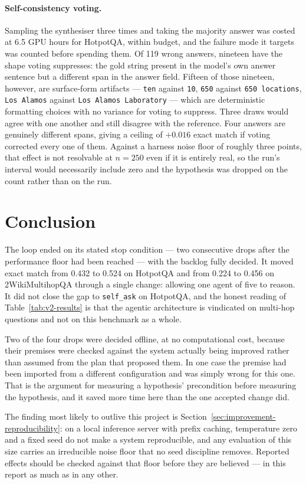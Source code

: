 \paragraph{Self-consistency voting.} Sampling the synthesiser three times and
taking the majority answer was costed at 6.5 GPU hours for HotpotQA, within
budget, and the failure mode it targets was counted before spending them. Of
119 wrong answers, nineteen have the shape voting suppresses: the gold string
present in the model's own answer sentence but a different span in the answer
field. Fifteen of those nineteen, however, are surface-form artifacts ---
\texttt{ten} against \texttt{10}, \texttt{650} against \texttt{650 locations},
\texttt{Los Alamos} against \texttt{Los Alamos Laboratory} --- which are
deterministic formatting choices with no variance for voting to suppress. Three
draws would agree with one another and still disagree with the reference. Four
answers are genuinely different spans, giving a ceiling of $+0.016$ exact match
if voting corrected every one of them. Against a harness noise floor of roughly
three points, that effect is not resolvable at $n = 250$ even if it is entirely
real, so the run's interval would necessarily include zero and the hypothesis
was dropped on the count rather than on the run.

\section{Conclusion}
\label{sec:improvement-conclusion}

The loop ended on its stated stop condition --- two consecutive drops after the
performance floor had been reached --- with the backlog fully decided. It moved
exact match from 0.432 to 0.524 on HotpotQA and from 0.224 to 0.456 on
2WikiMultihopQA through a single change: allowing one agent of five to reason.
It did not close the gap to \texttt{self\_ask} on HotpotQA, and the honest
reading of Table~\ref{tab:v2-results} is that the agentic architecture is
vindicated on multi-hop questions and not on this benchmark as a whole.

Two of the four drops were decided offline, at no computational cost, because
their premises were checked against the system actually being improved rather
than assumed from the plan that proposed them. In one case the premise had been
imported from a different configuration and was simply wrong for this one. That
is the argument for measuring a hypothesis' precondition before measuring the
hypothesis, and it saved more time here than the one accepted change did.

The finding most likely to outlive this project is
Section~\ref{sec:improvement-reproducibility}: on a local inference server with
prefix caching, temperature zero and a fixed seed do not make a system
reproducible, and any evaluation of this size carries an irreducible noise floor
that no seed discipline removes. Reported effects should be checked against that
floor before they are believed --- in this report as much as in any other.
